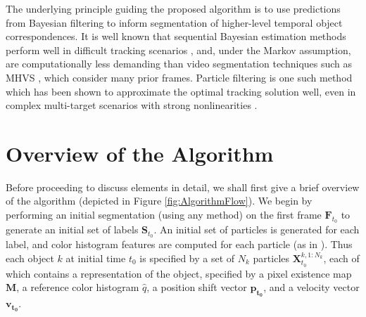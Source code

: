 The underlying principle guiding the proposed algorithm is to use predictions from Bayesian filtering to inform segmentation of higher-level temporal object correspondences. It is well known that sequential Bayesian estimation methods perform well in difficult tracking scenarios \cite{Doucet2001}, and, under the Markov assumption, are computationally less demanding than video segmentation techniques such as MHVS \cite{MHVS}, which consider many prior frames. Particle filtering is one such method which has been shown to approximate the optimal tracking solution well, even in complex multi-target scenarios with strong nonlinearities \cite{TrackingMultipleParticleFiltering,MonteCarloMTT,SequentialMonteCarloMultitargetFiltering}. 

\section{Overview of the Algorithm}
\label{sec:Overview}
Before proceeding to discuss elements in detail, we shall first give a brief overview of the algorithm (depicted in Figure \ref{fig:AlgorithmFlow}). We begin by performing an initial segmentation (using any method) on the first frame $\mathbf{F}_{t_0}$ to generate an initial set of labels $\mathbf{S}_{t_0}$. An initial set of particles is generated for each label, and color histogram features are computed for each particle (as in \cite{ColorBasedProbabilisticTracking}). Thus each object $k$ at initial time $t_0$ is specified by a set of $N_k$ particles $\mathbf{X}^{k,1:N_k}_{t_0}$, each of which contains a representation of the object, specified by a pixel existence map $\mathbf{M}$, a reference color histogram $\mathit{\hat{q}}$, a position shift vector $\mathbf{p_{t_0}}$, and a velocity vector $\mathbf{v_{t_0}}$.

